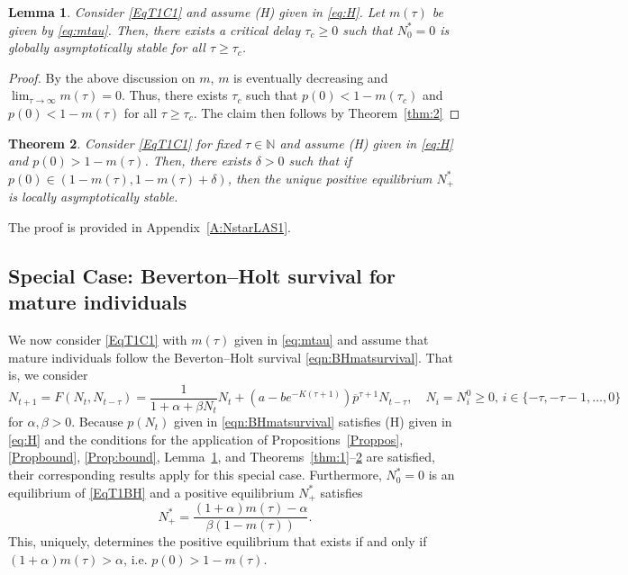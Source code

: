 \documentclass{article}
\newtheorem{theorem}{Theorem}
\numberwithin{theorem}{section}
\newtheorem{lemma}[theorem]{Lemma}
\begin{document}
{\begin{lemma}\label{lem:1}
    Consider \eqref{EqT1C1} and assume (H) given in \eqref{eq:H}.  Let $m(\tau)$ be given  by \eqref{eq:mtau}. Then, there exists a critical delay $\tau_c\geq 0$ such that $N^*_0=0$ is globally asymptotically stable for all $\tau\geq \tau_c$. 
\end{lemma}


\begin{proof}
By the above discussion on $m$, $m$ is eventually decreasing and $\lim_{\tau\to \infty}m(\tau)=0$. Thus, there exists $\tau_c$ such that $p(0)<1-m(\tau_c)$ and $p(0)<1-m(\tau)$ for all $\tau\geq \tau_c$. The claim then follows by Theorem~\ref{thm:2}
\end{proof}


\begin{theorem}\label{thm:NstarLAS1}
    Consider \eqref{EqT1C1} for fixed $\tau\in \mathbb{N}$ and assume (H) given in \eqref{eq:H} and  $p(0)>1-m(\tau)$. Then, there exists $\delta>0$ such that if $p(0)\in (1-m(\tau),1-m(\tau)+\delta)$, then the unique positive equilibrium $N^*_+$ is locally asymptotically stable. 
\end{theorem}

The proof is provided in Appendix~\ref{A:NstarLAS1}. 


\subsection{Special Case: Beverton--Holt survival for mature individuals}


We now consider \eqref{EqT1C1} with $m(\tau)$ given in \eqref{eq:mtau} and assume that mature individuals follow the Beverton--Holt survival \eqref{eqn:BHmatsurvival}. That is, we consider 
\begin{equation}\label{EqT1BH}
N_{t+1}=F(N_t, N_{t-\tau})=\frac{1}{1+\alpha+\beta N_t}N_t + \left(a - b e^{-K(\tau+1)}\right)
\overline{p}^{\tau+1} N_{t-\tau}, \quad  N_i=N_i^0 \geq 0, \, i  \in \{-\tau, -\tau-1, \ldots, 0\}
\end{equation}
for $\alpha, \beta>0$. Because $p(N_t)$ given in \eqref{eqn:BHmatsurvival} satisfies (H) given in \eqref{eq:H} and the conditions for the application of Propositions~\ref{Proppos}, \ref{Propbound}, \ref{Prop:bound}, Lemma~\ref{lem:1}, and Theorems~\ref{thm:1}--\ref{thm:NstarLAS1} are satisfied, their corresponding results apply for this special case. Furthermore, $N^*_0=0$ is an equilibrium of \eqref{EqT1BH} and  a positive equilibrium $N^*_+$ satisfies
\begin{equation}\label{T1C1Nstar}
 N^*_+ =\frac{(1+\alpha) m(\tau)-\alpha}{\beta(1 -m(\tau))}.  
\end{equation}
 This, uniquely, determines the positive equilibrium that exists if and only if $(1+\alpha)m(\tau)>\alpha$, i.e. $p(0)>1-m(\tau)$.

}
\end{document}
